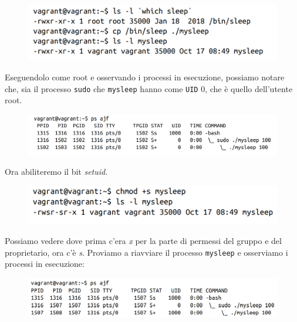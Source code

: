 
\begin{figure}[H]
    \centering
    \includegraphics[width=\textwidth, keepaspectratio]{capitoli/os_security/imgs/setuid1.png}
\end{figure}

Eseguendolo come root e osservando i processi in esecuzione, possiamo notare che,
sia il processo \verb|sudo| che \verb|mysleep| hanno come \verb|UID| 0, che è quello
dell'utente root.

\begin{figure}[H]
    \centering
    \includegraphics[width=\textwidth, keepaspectratio]{capitoli/os_security/imgs/setuid2.png}
\end{figure}


Ora abiliteremo il bit \textit{setuid}.

\begin{figure}[H]
    \centering
    \includegraphics[width=\textwidth, keepaspectratio]{capitoli/os_security/imgs/setuid3.png}
\end{figure}

Possiamo vedere dove prima c'era \textit{x} per la parte di permessi del gruppo e
del proprietario, ora c'è \textit{s}. Proviamo a riavviare il processo \verb|mysleep|
e osserviamo i processi in esecuzione:

\begin{figure}[H]
    \centering
    \includegraphics[width=\textwidth, keepaspectratio]{capitoli/os_security/imgs/setuid4.png}
\end{figure}

